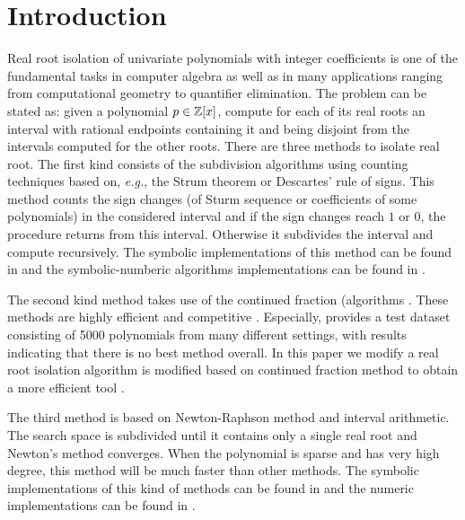 
\section{Introduction }
\label{}
Real root isolation of univariate polynomials with integer coefficients is one of the fundamental tasks in computer algebra as well as in many applications ranging from computational geometry to quantifier elimination. The problem can be stated as: given a polynomial $p\in {\mathbb Z}[x]$, compute for each of its real roots an interval with rational endpoints containing it and being disjoint from the intervals
computed for the other roots.  There are three methods to isolate real root.  The first kind consists of the subdivision algorithms using counting techniques based  on, {\it e.g.}, the Strum theorem or
Descartes' rule of signs.  This  method counts the sign changes (of Sturm sequence or coefficients of some polynomials) in the considered interval and if the sign changes reach $1$ or $0$, the procedure returns from this interval.
Otherwise it subdivides the interval and compute recursively. The symbolic implementations of this method can be found in \cite{collin76,rou04,kobel2016computing,Tsigaridas2016} and the symbolic-numberic algorithms implementations can be found in \cite{rou04,eig05,eig08,meh11}. 

The second kind method takes use of the continued fraction (algorithms \cite{akr08,tsi08,sha08}. These methods are highly efficient and competitive \cite{rou04,akr05,hemmer09}. Especially,  \cite{hemmer09} provides a test dataset   consisting of 5000 polynomials from many
different settings,  with results indicating that there is no best method overall. 
 In this paper we modify a real root isolation algorithm is modified based on  continued fraction method to obtain a more efficient tool \froot.

The third method is based on Newton-Raphson method and interval arithmetic.
The search space is subdivided until it contains only a single real root and Newton's method converges. When the polynomial is sparse and has very high degree, this method will be much faster than other methods. The symbolic implementations of this kind of methods can be found in \cite{xia06,xia07} and the numeric implementations
can be found in \cite{kla93,rump99}.

